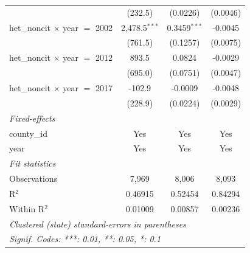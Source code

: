 \begin{tabular}{lccc}
                                                    & (232.5)                          & (0.0226)                     & (0.0046)\\   
   het\_noncit $\times$ year $=$ 2002               & 2,478.5$^{***}$                  & 0.3459$^{***}$               & -0.0045\\   
                                                    & (761.5)                          & (0.1257)                     & (0.0075)\\   
   het\_noncit $\times$ year $=$ 2012               & 893.5                            & 0.0824                       & -0.0029\\   
                                                    & (695.0)                          & (0.0751)                     & (0.0047)\\   
   het\_noncit $\times$ year $=$ 2017               & -102.9                           & -0.0009                      & -0.0048\\   
                                                    & (228.9)                          & (0.0224)                     & (0.0029)\\   
   \midrule
   \emph{Fixed-effects}\\
   county\_id                                       & Yes                              & Yes                          & Yes\\  
   year                                             & Yes                              & Yes                          & Yes\\  
   \midrule
   \emph{Fit statistics}\\
   Observations                                     & 7,969                            & 8,006                        & 8,093\\  
   R$^2$                                            & 0.46915                          & 0.52454                      & 0.84294\\  
   Within R$^2$                                     & 0.01009                          & 0.00857                      & 0.00236\\  
   \midrule \midrule
   \multicolumn{4}{l}{\emph{Clustered (state) standard-errors in parentheses}}\\
   \multicolumn{4}{l}{\emph{Signif. Codes: ***: 0.01, **: 0.05, *: 0.1}}\\
\end{tabular}
\par\endgroup


